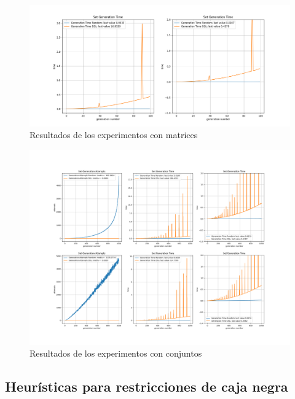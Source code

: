 \begin{figure}[!ht]
      \includegraphics[width=\linewidth]{Graphics/exp4.png}
      \caption{Resultados de los experimentos con matrices}
      \label{fig:exp4}
\end{figure}

\begin{figure}[H]
      \includegraphics[width=\linewidth]{Graphics/exp3.png}
      \caption{Resultados de los experimentos con conjuntos}
      \label{fig:exp3}
\end{figure}



\subsection{Heurísticas para restricciones de caja negra}

